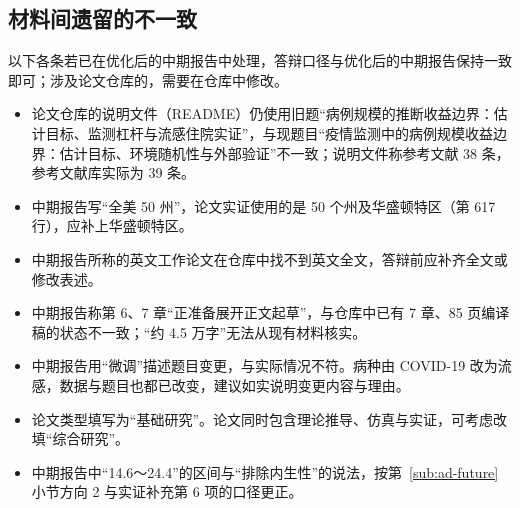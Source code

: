 \subsection{材料间遗留的不一致}

以下各条若已在优化后的中期报告中处理，答辩口径与优化后的中期报告保持一致即可；涉及论文仓库的，需要在仓库中修改。
\begin{itemize}
\item 论文仓库的说明文件（README）仍使用旧题“病例规模的推断收益边界：估计目标、监测杠杆与流感住院实证”，与现题目“疫情监测中的病例规模收益边界：估计目标、环境随机性与外部验证”不一致；说明文件称参考文献 38 条，参考文献库实际为 39 条。
\item 中期报告写“全美 50 州”，论文实证使用的是 50 个州及华盛顿特区（第 617 行），应补上华盛顿特区。
\item 中期报告所称的英文工作论文在仓库中找不到英文全文，答辩前应补齐全文或修改表述。
\item 中期报告称第 6、7 章“正准备展开正文起草”，与仓库中已有 7 章、85 页编译稿的状态不一致；“约 4.5 万字”无法从现有材料核实。
\item 中期报告用“微调”描述题目变更，与实际情况不符。病种由 COVID-19 改为流感，数据与题目也都已改变，建议如实说明变更内容与理由。
\item 论文类型填写为“基础研究”。论文同时包含理论推导、仿真与实证，可考虑改填“综合研究”。
\item 中期报告中“14.6～24.4”的区间与“排除内生性”的说法，按第~\ref{sub:ad-future} 小节方向 2 与实证补充第 6 项的口径更正。
\end{itemize}
